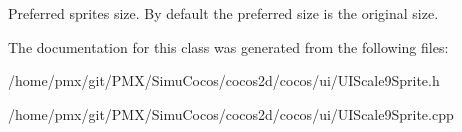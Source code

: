 Preferred sprite\textquotesingle{}s size. By default the preferred size is the original size. 

The documentation for this class was generated from the following files\+:\begin{DoxyCompactItemize}
\item 
/home/pmx/git/\+P\+M\+X/\+Simu\+Cocos/cocos2d/cocos/ui/U\+I\+Scale9\+Sprite.\+h\item 
/home/pmx/git/\+P\+M\+X/\+Simu\+Cocos/cocos2d/cocos/ui/U\+I\+Scale9\+Sprite.\+cpp\end{DoxyCompactItemize}
